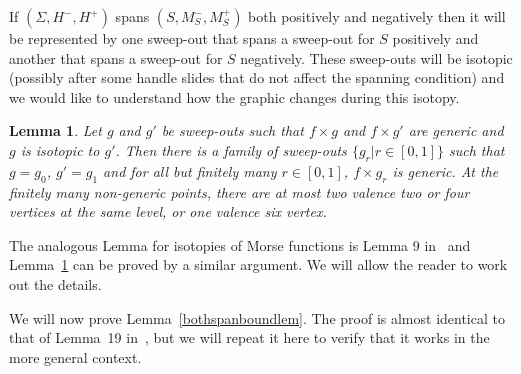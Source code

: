 \documentclass[12pt]{amsart}
\theoremstyle{plain}
\newtheorem{Lem}[Thm]{Lemma}
\theoremstyle{definition}
\begin{document}
If $(\Sigma, H^-, H^+)$ spans $(S, M_S^-, M_S^+)$ both positively and negatively then it will be represented by one sweep-out that spans a sweep-out for $S$ positively and another that spans a sweep-out for $S$ negatively.  These sweep-outs will be isotopic (possibly after some handle slides that do not affect the spanning condition) and we would like to understand how the graphic changes during this isotopy.

\begin{Lem}
\label{isotopesweepslem}
Let $g$ and $g'$ be sweep-outs such that $f \times g$ and $f \times g'$ are generic and $g$ is isotopic to $g'$.  Then there is a family of sweep-outs $\{g_r | r \in [0,1]\}$ such that $g = g_0$, $g' = g_1$ and for all but finitely many $r \in [0,1]$, $f \times g_r$ is generic.  At the finitely many non-generic points, there are at most two valence two or four vertices at the same level, or one valence six vertex.
\end{Lem}

The analogous Lemma for isotopies of Morse functions is Lemma 9 in~\cite{me:t3} and Lemma~\ref{isotopesweepslem} can be proved by a similar argument.  We will allow the reader to work out the details.

We will now prove Lemma~\ref{bothspanboundlem}.  The proof is almost identical to that of Lemma~19 in~\cite{me:stabs}, but we will repeat it here to verify that it works in the more general context.  
\end{document}
